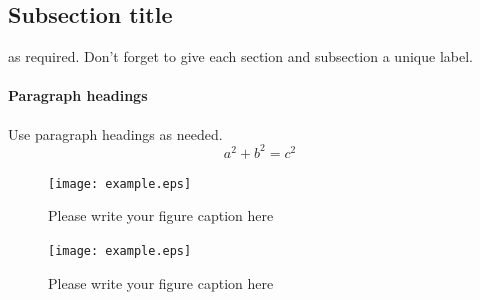 





\subsection{Subsection title}
\label{sec:2}
as required. Don't forget to give each section
and subsection a unique label.
\paragraph{Paragraph headings} Use paragraph headings as needed.
\begin{equation}
a^2+b^2=c^2
\end{equation}

\begin{figure}
  \texttt{[image: example.eps]}
\caption{Please write your figure caption here}
\label{fig:1}       %
\end{figure}
%
\begin{figure}
  \texttt{[image: example.eps]}
\caption{Please write your figure caption here}
\label{fig:2}       %
\end{figure}
%

